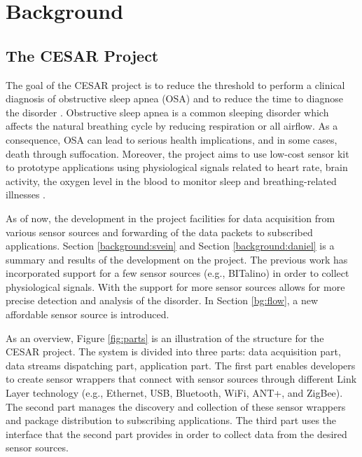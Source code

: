 \chapter{Background}

\section{The CESAR Project}
The goal of the CESAR project is to reduce the threshold to perform a clinical diagnosis of obstructive sleep apnea (OSA) and to reduce the time to diagnose the disorder \cite{cesarinfo}. Obstructive sleep apnea is a common sleeping disorder which affects the natural breathing cycle by reducing respiration or all airflow. As a consequence, OSA can lead to serious health implications, and in some cases, death through suffocation.  Moreover, the project aims to use low-cost sensor kit to prototype applications using physiological signals related to heart rate, brain activity, the oxygen level in the blood to monitor sleep and breathing-related illnesses \cite{cesar}.

As of now, the development in the project facilities for data acquisition from various sensor sources and forwarding of the data packets to subscribed applications. Section \ref{background:svein} and Section \ref{background:daniel} is a summary and results of the development on the project. The previous work has incorporated support for a few sensor sources (e.g., BITalino) in order to collect physiological signals. With the support for more sensor sources allows for more precise detection and analysis of the disorder. In Section \ref{bg:flow}, a new affordable sensor source is introduced.

As an overview, Figure \ref{fig:parts} is an illustration of the structure for the CESAR project. The system is divided into three parts: data acquisition part, data streams dispatching part, application part. The first part enables developers to create sensor wrappers that connect with sensor sources through different Link Layer technology (e.g., Ethernet, USB, Bluetooth, WiFi, ANT+, and ZigBee). The second part manages the discovery and collection of these sensor wrappers and package distribution to subscribing applications. The third part uses the interface that the second part provides in order to collect data from the desired sensor sources.

